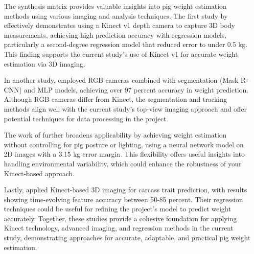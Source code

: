 {The synthesis matrix provides valuable insights into pig weight estimation methods using various imaging and analysis techniques. The first study by \citep{pezzuolo2018barn} effectively demonstrates using a Kinect v1 depth camera to capture 3D body measurements, achieving high prediction accuracy with regression models, particularly a second-degree regression model that reduced error to under 0.5 kg. This finding supports the current study’s use of Kinect v1 for accurate weight estimation via 3D imaging. 

In another study, \citep{karpinszky2023pig} employed RGB cameras combined with segmentation (Mask R-CNN) and MLP models, achieving over 97 percent accuracy in weight prediction. Although RGB cameras differ from Kinect, the segmentation and tracking methods align well with the current study’s top-view imaging approach and offer potential techniques for data processing in the project.

The work of \citep{jun2018estimating} further broadens applicability by achieving weight estimation without controlling for pig posture or lighting, using a neural network model on 2D images with a 3.15 kg error margin. This flexibility offers useful insights into handling environmental variability, which could enhance the robustness of your Kinect-based approach. 

Lastly, \citep{pena2019carcass} applied Kinect-based 3D imaging for carcass trait prediction, with results showing time-evolving feature accuracy between 50-85 percent. Their regression techniques could be useful for refining the project’s model to predict weight accurately.
Together, these studies provide a cohesive foundation for applying Kinect technology, advanced imaging, and regression methods in the current study, demonstrating approaches for accurate, adaptable, and practical pig weight estimation.

}